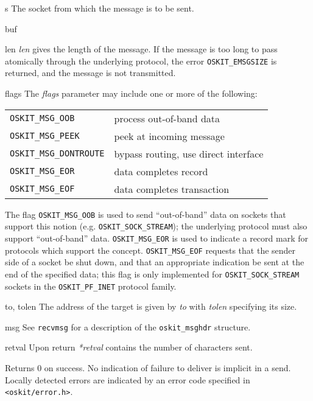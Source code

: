 \begin{apiparm}
        \item[s]
                The socket from which the message is to be sent.

	\item[buf]

	\item[len] \emph{len} gives the length of the message.
	If the message is too long to pass atomically through the underlying
	protocol, the error \texttt{OSKIT_EMSGSIZE} is returned,
	and the message is not transmitted.

	\item[flags]
	The \emph{flags}
	parameter may include one or more of the following:

	\begin{tabular}{ll}
	\texttt{OSKIT_MSG_OOB} &
	            process out-of-band data \\
        \texttt{OSKIT_MSG_PEEK} &
	            peek at incoming message \\
        \texttt{OSKIT_MSG_DONTROUTE} &
		    bypass routing, use direct interface \\
        \texttt{OSKIT_MSG_EOR} &
	            data completes record 	\\
        \texttt{OSKIT_MSG_EOF} &
	            data completes transaction \\
	\end{tabular}
	
	The flag \texttt{OSKIT_MSG_OOB} is used to send ``out-of-band''
	data on sockets that support this notion 
	(e.g. \texttt{OSKIT_SOCK_STREAM}); the underlying protocol
	must also support ``out-of-band'' data.
	\texttt{OSKIT_MSG_EOR} is used to indicate a record
	 mark for protocols which support the concept.
	\texttt{OSKIT_MSG_EOF}  requests that the
	sender side of a socket be shut down, and that an appropriate
	indication be sent at the end of the specified data;
	this flag is only implemented for \texttt{OSKIT_SOCK_STREAM}
	sockets in the \texttt{OSKIT_PF_INET} protocol family.

	\item[to, tolen]
	  The address of the target is given by \emph{to} with \emph{tolen}
	  specifying its size.

	\item[msg] 
	See \texttt{recvmsg} for a description of the 
	\texttt{oskit_msghdr} structure.

	\item[retval]
	Upon return \emph{*retval} contains the number of characters sent. 

\end{apiparm}

\begin{apiret}
        Returns 0 on success.
	No indication of failure to deliver is implicit in a send.
	Locally detected errors are indicated by an error code specified in
        {\tt <oskit/error.h>}.
\end{apiret}

